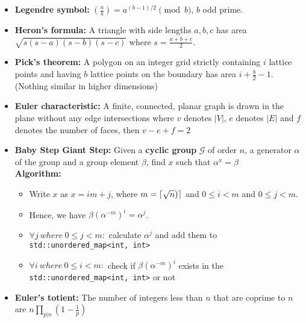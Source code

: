 \documentclass[13pt,a4paper]{article}
\DeclarePairedDelimiter{\ceil}{\lceil}{\rceil}
\begin{document}
\begin{landscape}

\begin{multicols*}{3}
    
\begin{itemize}
    \item \textbf{Legendre symbol:} $\left(\frac{a}{b}\right) = a^{(b-1)/2} \pmod{b}$, $b$ odd prime.
    \item \textbf{Heron's formula:} A triangle with side lengths
    $a,b,c$ has area $\sqrt{s(s-a)(s-b)(s-c)}$ where $s =
    \frac{a+b+c}{2}$.
    \item \textbf{Pick's theorem:} A polygon on an integer grid
    strictly containing $i$ lattice points and having $b$ lattice
    points on the boundary has area $i + \frac{b}{2} - 1$. (Nothing
    similar in higher dimensions)
    \item \textbf{Euler characteristic:} A finite, connected, planar graph is drawn in the plane without any edge intersections where $v$ denotes $|V|$, $e$ denotes $|E|$ and $f$ denotes the number of faces, then $v - e + f = 2$
    \item \textbf{Baby Step Giant Step:} Given a \textbf{cyclic group} $\mathcal{G}$ of order $n$, a generator $\alpha$ of the group and a group element $\beta$, find $x$ such that $\alpha^x = \beta$\\
        \textbf{Algorithm: }\begin{itemize}
            \item Write $x$ as $x = im + j$, where $m = \ceil{\sqrt{n})}$ and $0 \leq i < m$ and $0 \leq j < m$.
            \item Hence, we have $\beta(\alpha^{-m})^{i} = \alpha^j$.
            \item $\forall j\ where\ 0 \leq j < m:$ calculate $\alpha^j$ and add them to \verb!std::unordered_map<int, int>!
            \item $\forall i\ where\ 0 \leq i < m:$ check if $\beta(\alpha^{-m})^{i}$ exists in the \verb|std::unordered_map<int, int>| or not
        \end{itemize}
    \item \textbf{Euler's totient:} The number of integers less than
    $n$ that are coprime to $n$ are $n\prod_{p|n}\left(1 - \frac{1}{p}\right)$

\end{itemize}
\end{multicols*}
\end{landscape}
\end{document}
